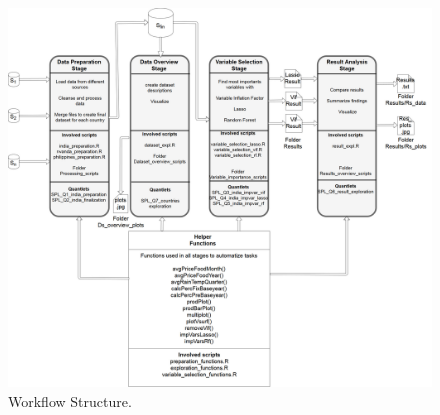 \documentclass[11pt]{article}
\begin{document}
\FloatBarrier
\begin{figure}[!htb]
\begin{center}
\includegraphics[scale=0.3]{figure1.png}
\caption{Workflow Structure.}
\label{figure1}
\end{center}
\end{figure}
\FloatBarrier
\end{document}

